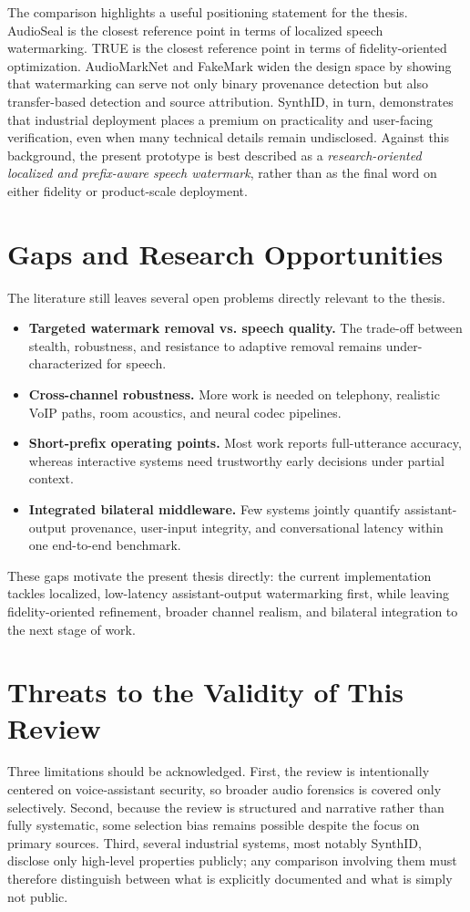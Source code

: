 The comparison highlights a useful positioning statement for the thesis. AudioSeal is the closest reference point in terms of localized speech watermarking. TRUE is the closest reference point in terms of fidelity-oriented optimization. AudioMarkNet and FakeMark widen the design space by showing that watermarking can serve not only binary provenance detection but also transfer-based detection and source attribution. SynthID, in turn, demonstrates that industrial deployment places a premium on practicality and user-facing verification, even when many technical details remain undisclosed. Against this background, the present prototype is best described as a \emph{research-oriented localized and prefix-aware speech watermark}, rather than as the final word on either fidelity or product-scale deployment.

\section{Gaps and Research Opportunities}
The literature still leaves several open problems directly relevant to the thesis.
\begin{itemize}[leftmargin=1.25em]
  \item \textbf{Targeted watermark removal vs. speech quality.} The trade-off between stealth, robustness, and resistance to adaptive removal remains under-characterized for speech.
  \item \textbf{Cross-channel robustness.} More work is needed on telephony, realistic VoIP paths, room acoustics, and neural codec pipelines.
  \item \textbf{Short-prefix operating points.} Most work reports full-utterance accuracy, whereas interactive systems need trustworthy early decisions under partial context.
  \item \textbf{Integrated bilateral middleware.} Few systems jointly quantify assistant-output provenance, user-input integrity, and conversational latency within one end-to-end benchmark.
\end{itemize}
These gaps motivate the present thesis directly: the current implementation tackles localized, low-latency assistant-output watermarking first, while leaving fidelity-oriented refinement, broader channel realism, and bilateral integration to the next stage of work.

\section{Threats to the Validity of This Review}
Three limitations should be acknowledged. First, the review is intentionally centered on voice-assistant security, so broader audio forensics is covered only selectively. Second, because the review is structured and narrative rather than fully systematic, some selection bias remains possible despite the focus on primary sources. Third, several industrial systems, most notably SynthID, disclose only high-level properties publicly; any comparison involving them must therefore distinguish between what is explicitly documented and what is simply not public.
